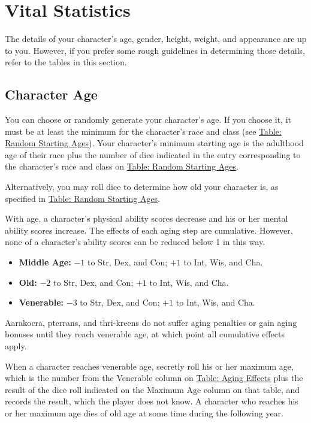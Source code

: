 \section{Vital Statistics}
The details of your character's age, gender, height, weight, and appearance are up to you. However, if you prefer some rough guidelines in determining those details, refer to the tables in this section.

\subsection{Character Age}
You can choose or randomly generate your character's age. If you choose it, it must be at least the minimum for the character's race and class (see \hyperref[tab:Random Starting Ages]{Table: Random Starting Ages}). Your character's minimum starting age is the adulthood age of their race plus the number of dice indicated in the entry corresponding to the character's race and class on \hyperref[tab:Random Starting Ages]{Table: Random Starting Ages}.

Alternatively, you may roll dice to determine how old your character is, as specified in \hyperref[tab:Random Starting Ages]{Table: Random Starting Ages}.

With age, a character's physical ability scores decrease and his or her mental ability scores increase. The effects of each aging step are cumulative. However, none of a character's ability scores can be reduced below 1 in this way.

\begin{itemize}
\setlength\itemsep{0em}
\item \textbf{Middle Age:} $-1$ to Str, Dex, and Con; $+1$ to Int, Wis, and Cha.
\item \textbf{Old:} $-2$ to Str, Dex, and Con; $+1$ to Int, Wis, and Cha.
\item \textbf{Venerable:} $-3$ to Str, Dex, and Con; $+1$ to Int, Wis, and Cha.
\end{itemize}

Aarakocra, pterrans, and thri-kreens do not suffer aging penalties or gain aging bonuses until they reach venerable age, at which point all cumulative effects apply.

When a character reaches venerable age, secretly roll his or her maximum age, which is the number from the Venerable column on \hyperref[tab:Aging Effects]{Table: Aging Effects} plus the result of the dice roll indicated on the Maximum Age column on that table, and records the result, which the player does not know. A character who reaches his or her maximum age dies of old age at some time during the following year.

